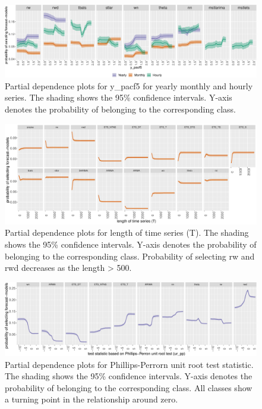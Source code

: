 \documentclass[11pt,a4paper,]{article}
\begin{document}
\begin{figure}[h]

{\centering \includegraphics[width=\textwidth]{figure/ypacf5-1} 

}

\caption{Partial dependence plots for y\_pacf5 for yearly monthly and hourly series. The shading shows the 95\% confidence intervals. Y-axis denotes the probability of belonging to the corresponding class. }\label{fig:ypacf5}
\end{figure}

\begin{figure}[h]

{\centering \includegraphics[width=\textwidth]{figure/pdpmonthlyN-1} 

}

\caption{Partial dependence plots for length of time series (T). The shading shows the 95\% confidence intervals. Y-axis denotes the probability of belonging to the corresponding class. Probability of selecting rw and rwd decreases as the length > 500.}\label{fig:pdpmonthlyN}
\end{figure}

\begin{figure}[h]

{\centering \includegraphics[width=\textwidth]{figure/pdpyearlyurpp-1} 

}

\caption{Partial dependence plots for Phillips-Perrorn unit root test statistic. The shading shows the 95\% confidence intervals. Y-axis denotes the probability of belonging to the corresponding class. All classes show a turning point in the relationship around zero.}\label{fig:pdpyearlyurpp}
\end{figure}
\end{document}
